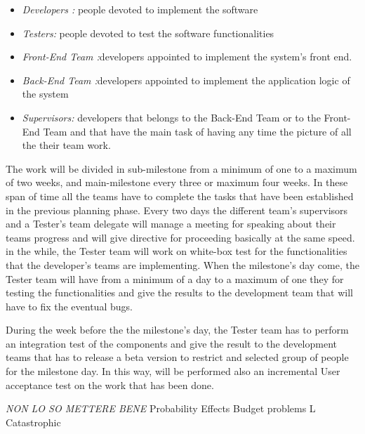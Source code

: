 \begin{itemize}
	\item \emph{Developers :} people devoted to implement the software
	
	\item \emph{Testers: }people devoted to test the software functionalities
	
	\item \emph{Front-End Team :}developers appointed to implement the system’s front end.
	
	
	\item \emph{Back-End Team :}developers appointed to implement the application logic of the system
	
	\item \emph{Supervisors: }developers that belongs to the Back-End Team or to the Front-End Team and that have the main task of having any time the picture of all the their team work.

\end{itemize}


The work will be divided in sub-milestone from a minimum of one to a maximum of two weeks, and main-milestone every three or maximum four weeks. In these span of time all the teams have to complete the tasks that have been established in the previous planning phase. Every two days the different team's supervisors and a Tester’s team delegate will manage a meeting for speaking about their teams progress and will give directive for proceeding basically at the same speed. 
in the while, the Tester team will work on white-box test for the functionalities that the developer’s teams are implementing.
When the milestone’s day come, the Tester team will have from a minimum of a day to a maximum of one they for testing the functionalities and give the results to the development team that will have to fix the eventual bugs.

During the week before the the milestone’s day, the Tester team has to perform an integration test of the components and give the result to the development teams that has to release a beta version to restrict and selected group of people for the milestone day. In this way, will be performed also an incremental User acceptance test on the work that has been done. 

\emph{ \huge NON LO SO METTERE BENE}
		Probability		Effects
		Budget problems		L			Catastrophic
		
